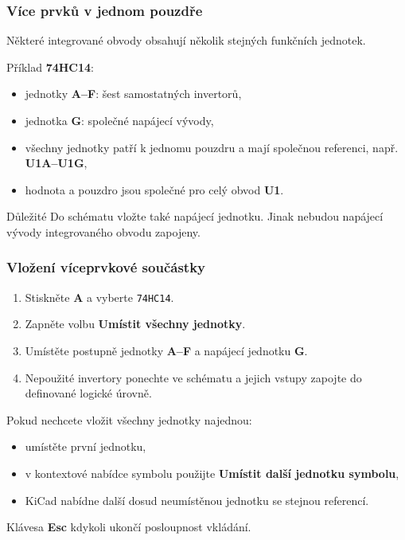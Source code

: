 \documentclass{beamer}
\begin{document}
\begin{frame}
	\frametitle{Více prvků v jednom pouzdře}
	Některé integrované obvody obsahují několik stejných funkčních jednotek.

	\medskip
	Příklad \textbf{74HC14}:
	\begin{itemize}
		\item jednotky \textbf{A--F}: šest samostatných invertorů,
		\item jednotka \textbf{G}: společné napájecí vývody,
		\item všechny jednotky patří k jednomu pouzdru a mají společnou referenci, např. \textbf{U1A--U1G},
		\item hodnota a pouzdro jsou společné pro celý obvod \textbf{U1}.
	\end{itemize}

	\vfill
	\begin{alertblock}{Důležité}
		Do schématu vložte také napájecí jednotku. Jinak nebudou napájecí vývody integrovaného obvodu zapojeny.
	\end{alertblock}
\end{frame}

\begin{frame}
	\frametitle{Vložení víceprvkové součástky}
	\begin{enumerate}
		\item Stiskněte \textbf{A} a vyberte \texttt{74HC14}.
		\item Zapněte volbu \textbf{Umístit všechny jednotky}.
		\item Umístěte postupně jednotky \textbf{A--F} a napájecí jednotku \textbf{G}.
		\item Nepoužité invertory ponechte ve schématu a jejich vstupy zapojte do definované logické úrovně.
	\end{enumerate}

	\medskip
	Pokud nechcete vložit všechny jednotky najednou:
	\begin{itemize}
		\item umístěte první jednotku,
		\item v kontextové nabídce symbolu použijte \textbf{Umístit další jednotku symbolu},
		\item KiCad nabídne další dosud neumístěnou jednotku se stejnou referencí.
	\end{itemize}

	\vfill
	Klávesa \textbf{Esc} kdykoli ukončí posloupnost vkládání.

\end{frame}
\end{document}
